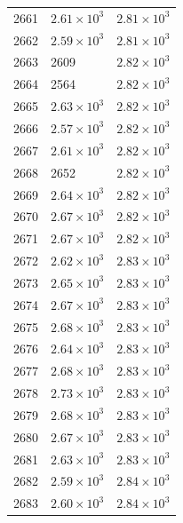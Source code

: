 \begin{table}[H]
\begin{tabular}{lll}
2661 & $\displaystyle 2.61 \times 10^{3}$ & $\displaystyle 2.81 \times 10^{3}$ \\
2662 & $\displaystyle 2.59 \times 10^{3}$ & $\displaystyle 2.81 \times 10^{3}$ \\
2663 & 2609 & $\displaystyle 2.82 \times 10^{3}$ \\
2664 & 2564 & $\displaystyle 2.82 \times 10^{3}$ \\
2665 & $\displaystyle 2.63 \times 10^{3}$ & $\displaystyle 2.82 \times 10^{3}$ \\
2666 & $\displaystyle 2.57 \times 10^{3}$ & $\displaystyle 2.82 \times 10^{3}$ \\
2667 & $\displaystyle 2.61 \times 10^{3}$ & $\displaystyle 2.82 \times 10^{3}$ \\
2668 & 2652 & $\displaystyle 2.82 \times 10^{3}$ \\
2669 & $\displaystyle 2.64 \times 10^{3}$ & $\displaystyle 2.82 \times 10^{3}$ \\
2670 & $\displaystyle 2.67 \times 10^{3}$ & $\displaystyle 2.82 \times 10^{3}$ \\
2671 & $\displaystyle 2.67 \times 10^{3}$ & $\displaystyle 2.82 \times 10^{3}$ \\
2672 & $\displaystyle 2.62 \times 10^{3}$ & $\displaystyle 2.83 \times 10^{3}$ \\
2673 & $\displaystyle 2.65 \times 10^{3}$ & $\displaystyle 2.83 \times 10^{3}$ \\
2674 & $\displaystyle 2.67 \times 10^{3}$ & $\displaystyle 2.83 \times 10^{3}$ \\
2675 & $\displaystyle 2.68 \times 10^{3}$ & $\displaystyle 2.83 \times 10^{3}$ \\
2676 & $\displaystyle 2.64 \times 10^{3}$ & $\displaystyle 2.83 \times 10^{3}$ \\
2677 & $\displaystyle 2.68 \times 10^{3}$ & $\displaystyle 2.83 \times 10^{3}$ \\
2678 & $\displaystyle 2.73 \times 10^{3}$ & $\displaystyle 2.83 \times 10^{3}$ \\
2679 & $\displaystyle 2.68 \times 10^{3}$ & $\displaystyle 2.83 \times 10^{3}$ \\
2680 & $\displaystyle 2.67 \times 10^{3}$ & $\displaystyle 2.83 \times 10^{3}$ \\
2681 & $\displaystyle 2.63 \times 10^{3}$ & $\displaystyle 2.83 \times 10^{3}$ \\
2682 & $\displaystyle 2.59 \times 10^{3}$ & $\displaystyle 2.84 \times 10^{3}$ \\
2683 & $\displaystyle 2.60 \times 10^{3}$ & $\displaystyle 2.84 \times 10^{3}$ \\

\end{tabular}
\end{table}
